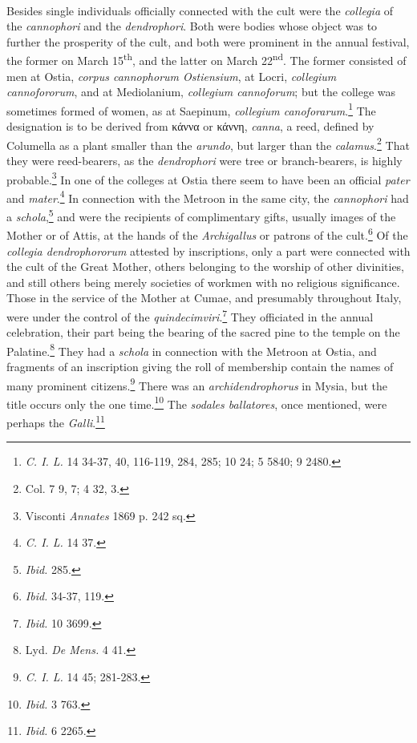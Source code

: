 \documentclass[a4paper, 11pt, oneside, polutonikogreek, french]{article}
\begin{document}
\paragraph{}
Besides single individuals officially connected with the cult were the \emph{collegia} of the \emph{cannophori} and the \emph{dendrophori}. Both were bodies whose object was to further the prosperity of the cult, and both were prominent in the annual festival, the former on March 15\textsuperscript{th}, and the latter on March 22\textsuperscript{nd}. The former consisted of men at Ostia, \emph{corpus cannophorum Ostiensium}, at Locri, \emph{collegium cannofororum}, and at Mediolanium, \emph{collegium cannoforum}; but the college was sometimes formed of women, as at Saepinum, \emph{collegium canoforarum}.\footnote{\emph{C. I. L.} 14 34-37, 40, 116-119, 284, 285; 10 24; 5 5840; 9 2480.} The designation is to be derived from κάννα or κάννη, \emph{canna}, a reed, defined by Columella as a plant smaller than the \emph{arundo}, but larger than the \emph{calamus}.\footnote{Col. 7 9, 7; 4 32, 3.} That they were reed-bearers, as the \emph{dendrophori} were tree or branch-bearers, is highly probable.\footnote{Visconti \emph{Annates} 1869 p. 242 sq.} In one of the colleges at Ostia there seem to have been an official \emph{pater} and \emph{mater}.\footnote{\emph{C. I. L.} 14 37.} In connection with the Metroon in the same city, the \emph{cannophori} had a \emph{schola},\footnote{\emph{Ibid.} 285.} and were the recipients of complimentary gifts, usually images of the Mother or of Attis, at the hands of the \emph{Archigallus} or patrons of the cult.\footnote{\emph{Ibid.} 34-37, 119.} Of the \emph{collegia dendrophororum} attested by inscriptions, only a part were connected with the cult of the Great Mother, others belonging to the worship of other divinities, and still others being merely societies of workmen with no religious significance. Those in the service of the Mother at Cumae, and presumably throughout Italy, were under the control of the \emph{quindecimviri}.\footnote{\emph{Ibid.} 10 3699.} They officiated in the annual celebration, their part being the bearing of the sacred pine to the temple on the Palatine.\footnote{Lyd. \emph{De Mens.} 4 41.} They had a \emph{schola} in connection with the Metroon at Ostia, and fragments of an inscription giving the roll of membership contain the names of many prominent citizens.\footnote{\emph{C. I. L.} 14 45; 281-283.} There was an \emph{archidendrophorus} in Mysia, but the title occurs only the one time.\footnote{\emph{Ibid.} 3 763.} The \emph{sodales ballatores}, once mentioned, were perhaps the \emph{Galli}.\footnote{\emph{Ibid.} 6 2265.}
\end{document}

